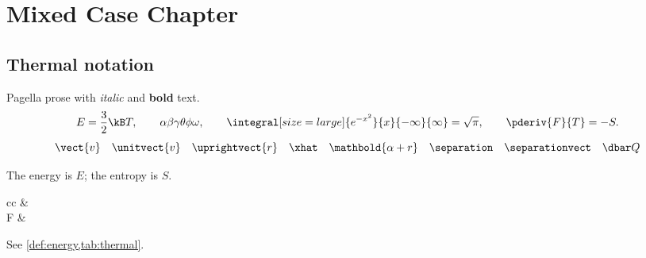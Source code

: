 \setcounter{tocdepth}{0}
\tableofcontents
\setcounter{tocdepth}{1}
\chapter{Mixed Case Chapter}
\localtableofcontents
\section{Thermal notation}
Pagella prose with \textit{italic} and \textbf{bold} text.
\[
  E=\frac{3}{2}\kB T,\qquad
  \alpha\beta\gamma\theta\phi\omega,\qquad
  \integral[size=large]{e^{-x^2}}{x}{-\infty}{\infty}=\sqrt{\pi},\qquad
  \pderiv{F}{T}=-S.
\]
\[
  \vect{v}\quad\unitvect{v}\quad\uprightvect{r}\quad\xhat\quad
  \mathbold{\alpha+r}\quad\separation\quad\separationvect\quad\dbar Q
\]
\begin{definition}[Energy]\label{def:energy}
  The energy is $E$; the entropy is $S$.
\end{definition}
\begin{mathtable}[caption={Thermal quantities},label=tab:thermal]{cc}
   & \\
  F & \\
  \bottomrule
\end{mathtable}
See \cref{def:energy,tab:thermal}.
